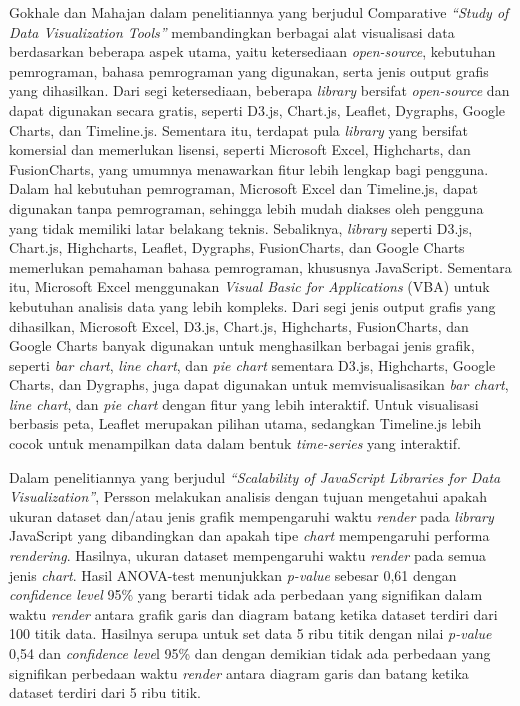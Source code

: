 Gokhale dan Mahajan \cite{Gokhale2020} dalam penelitiannya yang berjudul Comparative \textit{“Study of Data Visualization Tools”} membandingkan berbagai alat visualisasi data berdasarkan beberapa aspek utama, yaitu ketersediaan \textit{open-source}, kebutuhan pemrograman, bahasa pemrograman yang digunakan, serta jenis output grafis yang dihasilkan. Dari segi ketersediaan, beberapa \textit{library} bersifat \textit{open-source} dan dapat digunakan secara gratis, seperti D3.js, Chart.js, Leaflet, Dygraphs, Google Charts, dan Timeline.js. Sementara itu, terdapat pula \textit{library} yang bersifat komersial dan memerlukan lisensi, seperti Microsoft Excel, Highcharts, dan FusionCharts, yang umumnya menawarkan fitur lebih lengkap bagi pengguna. Dalam hal kebutuhan pemrograman, Microsoft Excel dan Timeline.js, dapat digunakan tanpa pemrograman, sehingga lebih mudah diakses oleh pengguna yang tidak memiliki latar belakang teknis. Sebaliknya, \textit{library} seperti D3.js, Chart.js, Highcharts, Leaflet, Dygraphs, FusionCharts, dan Google Charts memerlukan pemahaman bahasa pemrograman, khususnya JavaScript. Sementara itu, Microsoft Excel menggunakan \textit{Visual Basic for Applications} (VBA) untuk kebutuhan analisis data yang lebih kompleks. Dari segi jenis output grafis yang dihasilkan, Microsoft Excel, D3.js, Chart.js, Highcharts, FusionCharts, dan Google Charts banyak digunakan untuk menghasilkan berbagai jenis grafik, seperti \textit{bar chart}, \textit{line chart}, dan \textit{pie chart} sementara D3.js, Highcharts, Google Charts, dan Dygraphs, juga dapat digunakan untuk memvisualisasikan \textit{bar chart}, \textit{line chart}, dan \textit{pie chart} dengan fitur yang lebih interaktif. Untuk visualisasi berbasis peta, Leaflet merupakan pilihan utama, sedangkan Timeline.js lebih cocok untuk menampilkan data dalam bentuk \textit{time-series} yang interaktif.

Dalam penelitiannya yang berjudul \textit{“Scalability of JavaScript Libraries for Data Visualization”}, Persson \cite{Persson2021} melakukan analisis dengan tujuan mengetahui apakah ukuran dataset dan/atau jenis grafik mempengaruhi waktu \textit{render} pada \textit{library} JavaScript yang dibandingkan dan apakah tipe \textit{chart} mempengaruhi performa \textit{rendering}. Hasilnya, ukuran dataset mempengaruhi waktu \textit{render} pada semua jenis \textit{chart}. Hasil ANOVA-test menunjukkan \textit{p-value} sebesar 0,61 dengan \textit{confidence level} 95\% yang berarti tidak ada perbedaan yang signifikan dalam waktu \textit{render} antara grafik garis dan diagram batang ketika dataset terdiri dari 100 titik data. Hasilnya serupa untuk set data 5 ribu titik dengan nilai \textit{p-value} 0,54 dan \textit{confidence leve}l 95\% dan dengan demikian tidak ada perbedaan yang signifikan perbedaan waktu \textit{render} antara diagram garis dan batang ketika dataset terdiri dari 5 ribu titik.

